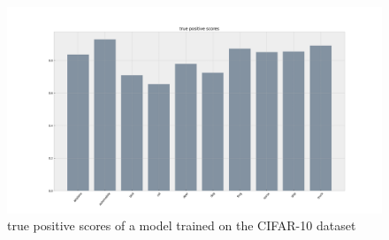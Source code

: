 \documentclass[journal]{IEEEtran}
\begin{document}
\begin{figure}[h!]
        \includegraphics[width=\linewidth]{images/cifar10_tp_scores.png}
        \caption{true positive scores of a model trained on the CIFAR-10 dataset}
        \label{fig:tp2_scores}
\end{figure}

\end{document}
